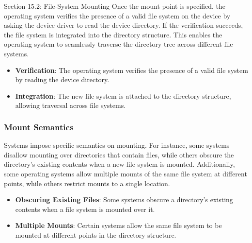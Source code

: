\begin{notes}{Section 15.2: File-System Mounting}
    Once the mount point is specified, the operating system verifies the presence of a valid file system on the device by asking the device driver to read the device directory. If the verification 
    succeeds, the file system is integrated into the directory structure. This enables the operating system to seamlessly traverse the directory tree across different file systems.
    
    \begin{highlight}
    
        \begin{itemize}
            \item \textbf{Verification}: The operating system verifies the presence of a valid file system by reading the device directory.
            \item \textbf{Integration}: The new file system is attached to the directory structure, allowing traversal across file systems.
        \end{itemize}
    
    \end{highlight}
    
    \subsubsection*{Mount Semantics}
    
    Systems impose specific semantics on mounting. For instance, some systems disallow mounting over directories that contain files, while others obscure the directory's existing contents when a new 
    file system is mounted. Additionally, some operating systems allow multiple mounts of the same file system at different points, while others restrict mounts to a single location.
    
    \begin{highlight}
    
        \begin{itemize}
            \item \textbf{Obscuring Existing Files}: Some systems obscure a directory's existing contents when a file system is mounted over it.
            \item \textbf{Multiple Mounts}: Certain systems allow the same file system to be mounted at different points in the directory structure.
        \end{itemize}
    
    \end{highlight}
    

\end{notes}
